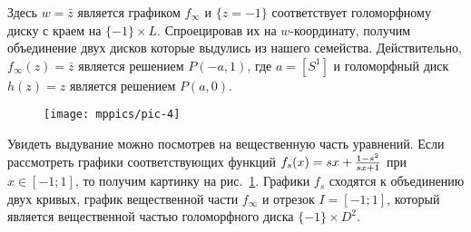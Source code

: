 Здесь $w = \bar z$ является графиком $f_\infty$ и $\{z = -1\}$ соответствует голоморфному диску с краем на $\{-1\} \times L$.
Спроецировав их на $w$-координату, получим объединение двух дисков которые выдулись из нашего семейства.
Действительно, $f_\infty (z) = \bar z$ является решением $P (-a, 1)$, где $a = [S^1]$ и голоморфный диск $h (z) = z$ является решением $P (a, 0)$.

\begin{figure}[ht!]
\vskip-0mm
\centering
\texttt{[image: mppics/pic-4]}
\caption{}\label{pic-4}
\vskip0mm
\end{figure}

Увидеть выдувание можно посмотрев на вещественную часть уравнений.
Если рассмотреть графики соответствующих функций
$f_s(x)\z=sx+\frac{1-s^2}{sx+1}$ при $x \in [-1;1]$, 
то получим картинку на рис.~\ref{pic-4}. 
Графики $f_s$ сходятся к объединению двух кривых, график вещественной
части $f_\infty$ и отрезок $I = [-1;1]$, который является
вещественной частью голоморфного диска $\{-1\} \times D^2$.  
